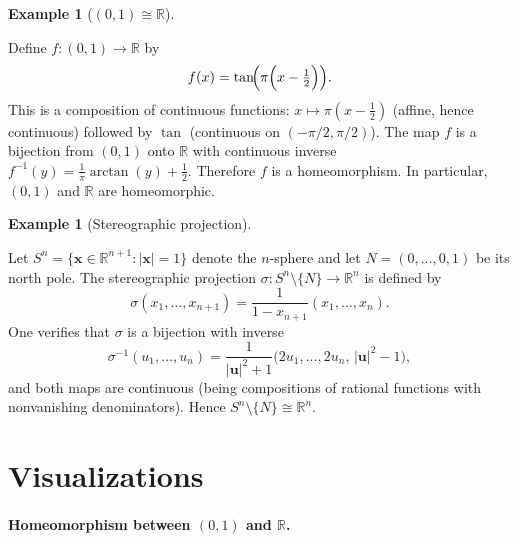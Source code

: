 \documentclass[11pt,a4paper,twoside]{book}
\theoremstyle{remark}
\theoremstyle{definition}
\newtheorem{exampleplain}[theorem]{Example}
\theoremstyle{definition}
\newenvironment{example}[1][]{%
  \begin{exampleplain}[#1]\itshape
}{%
  \end{exampleplain}
}
\begin{document}
\begin{example}[$(0,1)\cong\mathbb{R}$]
\label{ex:01-homeo-R}
Define $f\colon(0,1)\to\mathbb{R}$ by
\[
    f(x) = \tan\!\Bigl(\pi\Bigl(x-\tfrac{1}{2}\Bigr)\Bigr).
\]
This is a composition of continuous functions: $x\mapsto \pi(x-\frac{1}{2})$
(affine, hence continuous) followed by $\tan$ (continuous on
$(-\pi/2,\pi/2)$).  The map $f$ is a bijection from $(0,1)$ onto $\mathbb{R}$
with continuous inverse $f^{-1}(y)=\frac{1}{\pi}\arctan(y)+\frac{1}{2}$.
Therefore $f$ is a homeomorphism.  In particular, $(0,1)$ and $\mathbb{R}$ are
homeomorphic.
\end{example}

\begin{example}[Stereographic projection]
\label{ex:stereographic}
Let $S^n=\{\mathbf{x}\in\mathbb{R}^{n+1}:|\mathbf{x}|=1\}$ denote the
$n$-sphere and let $N=(0,\ldots,0,1)$ be its north pole.  The stereographic
projection $\sigma\colon S^n\setminus\{N\}\to\mathbb{R}^n$ is defined by
\[
    \sigma(x_1,\ldots,x_{n+1})
    = \frac{1}{1-x_{n+1}}(x_1,\ldots,x_n).
\]
One verifies that $\sigma$ is a bijection with inverse
\[
    \sigma^{-1}(u_1,\ldots,u_n)
    = \frac{1}{|\mathbf{u}|^2+1}
      \bigl(2u_1,\ldots,2u_n,\,|\mathbf{u}|^2-1\bigr),
\]
and both maps are continuous (being compositions of rational functions with
nonvanishing denominators).  Hence $S^n\setminus\{N\}\cong\mathbb{R}^n$.
\end{example}

\section{Visualizations}
\label{sec:continuity-tikz}

\paragraph{Homeomorphism between $(0,1)$ and $\mathbb{R}$.}

\begin{center}
\end{center}
\end{document}
